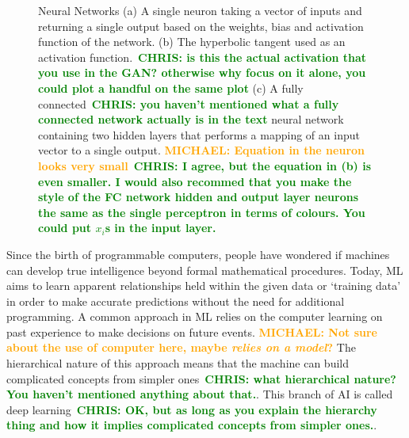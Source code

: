 \documentclass[12pt]{iopart}
\newcommand{\chris}[1]{\textbf{\textcolor{green}{CHRIS: #1}}}
\newcommand{\michael}[1]{\textbf{\textcolor{orange}{MICHAEL: #1}}}
\begin{document}
\begin{figure}
\begin{minipage}[b]{0.7\linewidth}
    \end{minipage}
    \caption{Neural Networks (a) A single neuron taking a vector of inputs and
returning a single output based on the weights, bias and activation function
of the network. (b) The hyperbolic tangent used as an activation
function.~\chris{is this the actual activation that you use in the GAN?
otherwise why focus on it alone, you could plot a handful on the same plot} (c)
A fully connected~\chris{you haven't mentioned what a fully connected network
actually is in the text} neural network containing two hidden layers that performs a
mapping of an input vector to a single output. \michael{Equation in the
neuron looks very small}~\chris{I agree, but the equation in (b) is even
smaller. I would also recommed that you make the style of the FC network hidden
and output layer neurons the same as the single perceptron in terms of colours.
You could put $x_i$s in the input layer.}}
\end{figure}

%
Since the birth of programmable computers, people have wondered if machines can
develop true intelligence beyond formal mathematical procedures. Today, \ac{ML}
aims to learn apparent relationships held within the given data or `training
data' in order to make accurate predictions without the need for additional
programming. A common approach in \ac{ML} relies on the computer learning on
past experience to make decisions on future events. \michael{Not sure about the
use of computer here, maybe \textit{relies on a model}?} The hierarchical
nature of this approach means that the machine can build complicated concepts
from simpler ones~\chris{what hierarchical nature? You haven't mentioned
anything about that.}. This branch of \ac{AI} is called deep
learning~\chris{OK, but as long as you explain the hierarchy thing and how it
implies complicated concepts from simpler ones.}. 
\end{document}
